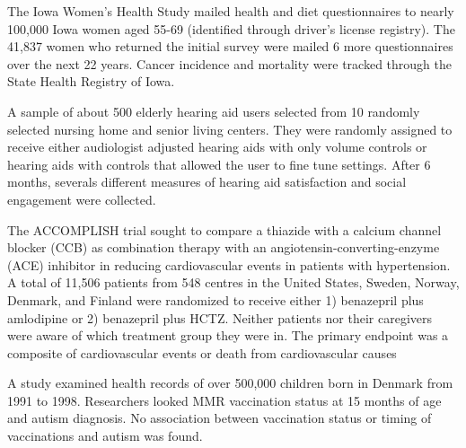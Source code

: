 \documentclass{article}
\begin{document}
\begin{flushleft}
\begin{enumalpha}
\item The Iowa Women's Health Study mailed health and diet questionnaires to nearly 100,000 Iowa women aged 55-69 (identified through driver's license registry). The 41,837 women who returned the initial survey were mailed 6 more questionnaires over the next 22 years. Cancer incidence and mortality were tracked through the State Health Registry of Iowa.
\vspace{1in}

\item A sample of about 500 elderly hearing aid users selected from 10 randomly selected nursing home and senior living centers. They were randomly assigned to receive either audiologist adjusted hearing aids with only volume controls or hearing aids with controls that allowed the user to fine tune settings. After 6 months, severals different measures of hearing aid satisfaction and social engagement were collected.
\vspace{1in}

\item The ACCOMPLISH trial sought to compare a thiazide with a calcium channel blocker (CCB) as combination therapy with an angiotensin-converting-enzyme (ACE) inhibitor in reducing cardiovascular events in patients with hypertension. A total of 11,506 patients from 548 centres in the United States, Sweden, Norway, Denmark, and Finland were randomized to receive either 1) benazepril plus amlodipine or 2) benazepril plus HCTZ. Neither patients nor their caregivers were aware of which treatment group they were in. The primary endpoint was a composite of cardiovascular events or death from cardiovascular causes
\vspace{1in}

\item A study examined health records of over 500,000 children born in Denmark from 1991 to 1998. Researchers looked MMR vaccination status at 15 months of age and autism diagnosis. No association between vaccination status or timing of vaccinations and autism was found.
\end{enumalpha} 
\end{flushleft}
\end{document}
